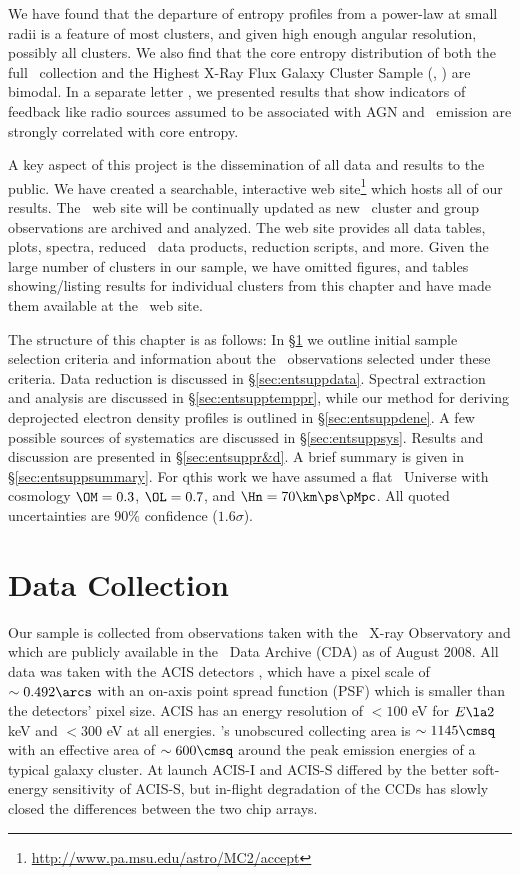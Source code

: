 We have found that the departure of entropy profiles from a power-law
at small radii is a feature of most clusters, and given high enough
angular resolution, possibly all clusters. We also find that the core
entropy distribution of both the full \accept\ collection and the
Highest X-Ray Flux Galaxy Cluster Sample (\hifl, \citealt{hiflugcs1,
  hiflugcs2}) are bimodal. In a separate letter \citep{haradent}, we
presented results that show indicators of feedback like radio sources
assumed to be associated with AGN and \halpha\ emission are strongly
correlated with core entropy.

A key aspect of this project is the dissemination of all data and
results to the public. We have created a searchable, interactive web
site\footnote{\url{http://www.pa.msu.edu/astro/MC2/accept}} which
hosts all of our results. The \accept\ web site will be continually
updated as new \chandra\ cluster and group observations are archived
and analyzed. The web site provides all data tables, plots, spectra,
reduced \chandra\ data products, reduction scripts, and more. Given
the large number of clusters in our sample, we have omitted figures,
and tables showing/listing results for individual clusters from this
chapter and have made them available at the \accept\ web site.

The structure of this chapter is as follows: In
\S\ref{sec:entsuppsample} we outline initial sample selection criteria
and information about the
\chandra\ observations selected under these criteria. Data reduction
is discussed in \S\ref{sec:entsuppdata}. Spectral extraction and analysis are
discussed in \S\ref{sec:entsupptemppr}, while our method for deriving
deprojected electron density profiles is outlined in
\S\ref{sec:entsuppdene}. A few possible sources of systematics are discussed
in \S\ref{sec:entsuppsys}. Results and discussion are presented in
\S\ref{sec:entsuppr&d}. A brief summary is given in
\S\ref{sec:entsuppsummary}. For qthis work we have assumed a flat \LCDM\ Universe with cosmology
$\OM=0.3$, $\OL=0.7$, and $\Hn=70\km\ps\pMpc$. All quoted
uncertainties are 90\% confidence ($1.6\sigma$).

\section{Data Collection}
\label{sec:entsuppsample}

Our sample is collected from observations taken with the
\chandra\ X-ray Observatory \citep{chandra} and which are publicly
available in the \chandra\ Data Archive (CDA) as of August 2008. All
data was taken with the ACIS detectors \citep{acis}, which have a
pixel scale of $\sim 0.492\arcs$ with an on-axis point spread function
(PSF) which is smaller than the detectors' pixel size. ACIS has an
energy resolution of $< 100$ eV for $E \la 2$ keV and $< 300$ eV at
all energies. \chandra's unobscured collecting area is $\sim 1145
\cmsq$ with an effective area of $\sim 600 \cmsq$ around the peak
emission energies of a typical galaxy cluster. At launch ACIS-I and
ACIS-S differed by the better soft-energy sensitivity of ACIS-S, but
in-flight degradation of the CCDs has slowly closed the differences
between the two chip arrays.

